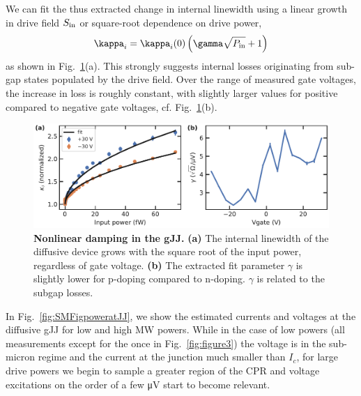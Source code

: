We can fit the thus extracted change in internal linewidth using a linear growth in drive field $S_{\rm in}$ or square-root dependence on drive power,
\begin{align}
\kappa_i=\kappa_i(0)\left(\gamma\sqrt{P_{\rm in}}+1\right)
\label{eq:kintfitpower}
\end{align}
as shown in Fig.~\ref{fig:SMFig-lossrates-power}(a).
%
This strongly suggests internal losses originating from sub-gap states populated by the drive field.
%
Over the range of measured gate voltages, the increase in loss is roughly constant, with slightly larger values for positive compared to negative gate voltages, cf. Fig.~\ref{fig:SMFig-lossrates-power}(b).

\begin{figure}
	\centering
	\includegraphics[width=\linewidth]{chapter-gJJ-CPR/figs/SMFigure-lossrates-power}
	\caption{
		\textbf{Nonlinear damping in the gJJ.}
		\textbf{(a)} The internal linewidth of the diffusive device grows with the square root of the input power, regardless of gate voltage.
		\textbf{(b)} The extracted fit parameter $\gamma$ is slightly lower for p-doping compared to n-doping.
		$\gamma$ is related to the subgap losses.
	}
	\label{fig:SMFig-lossrates-power}
\end{figure}

In Fig.~\ref{fig:SMFigpoweratJJ}, we show the estimated currents and voltages at the diffusive gJJ for low and high MW powers.
%
While in the case of low powers (all measurements except for the once in Fig.~\ref{fig:figure3}) the voltage is in the sub-micron regime and the current at the junction much smaller than $I_c$, for large drive powers we begin to sample a greater region of the CPR and voltage excitations on the order of a few \si{\micro\volt} start to become relevant.

